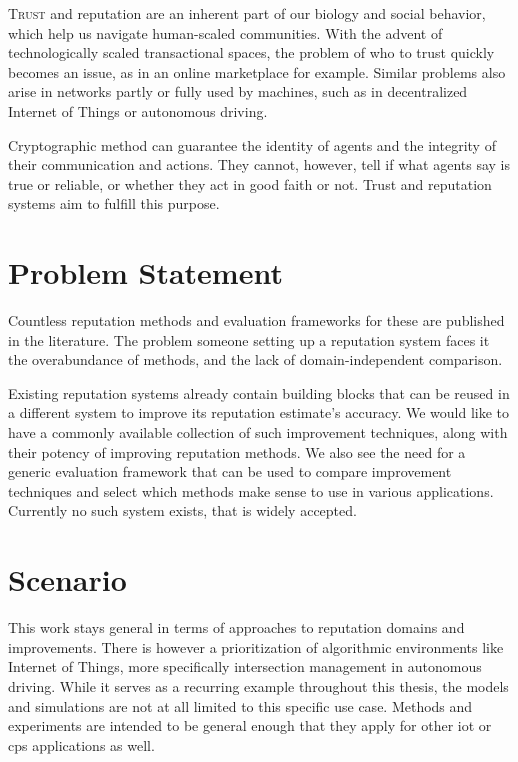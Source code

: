 \documentclass[%
    ]{\PathToTumTemplate/thesis/tum_thesis}
\begin{document}

\lettrine{T}{rust} and reputation are an inherent part of our biology and social behavior, which help us navigate human-scaled communities.
With the advent of technologically scaled transactional spaces, the problem of who to trust quickly becomes an issue, as in an online marketplace for example.
Similar problems also arise in networks partly or fully used by machines, such as in decentralized Internet of Things or autonomous driving.

Cryptographic method can guarantee the identity of agents and the integrity of their communication and actions.
They cannot, however, tell if what agents say is true or reliable, or whether they act in good faith or not.
Trust and reputation systems aim to fulfill this purpose.



\section{Problem Statement}\label{sec:probstat}
Countless reputation methods and evaluation frameworks for these are published in the literature.
The problem someone setting up a reputation system faces it the overabundance of methods, and the lack of domain-independent comparison.

Existing reputation systems already contain building blocks that can be reused in a different system to improve its reputation estimate's accuracy.
We would like to have a commonly available collection of such improvement techniques, along with their potency of improving reputation methods.
We also see the need for a generic evaluation framework that can be used to compare improvement techniques and select which methods make sense to use in various applications.
Currently no such system exists, that is widely accepted.



\section{Scenario}

This work stays general in terms of approaches to reputation domains and improvements.
There is however a prioritization of algorithmic environments like Internet of Things, more specifically intersection management in autonomous driving.
While it serves as a recurring example throughout this thesis, the models and simulations are not at all limited to this specific use case.
Methods and experiments are intended to be general enough that they apply for other \gls{iot} or \gls{cps} applications as well.
\end{document}
